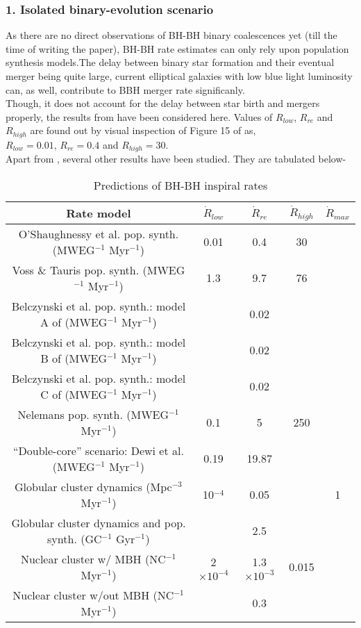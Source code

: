 \documentclass{article}
\numberwithin{equation}{section}
\begin{document}
\subsubsection*{1. Isolated binary-evolution scenario}
As there are no direct observations of BH-BH binary coalescences yet (till the time of writing the paper), BH-BH rate estimates can only rely upon population synthesis models.The delay between binary star formation and their eventual merger being quite large, current elliptical galaxies with low blue light luminosity can, as well, contribute to BBH merger rate significanly.\\
Though, it does not account for the delay between star birth and mergers properly, the results from \cite{14} have been considered here. Values of $R_{low}$, $R_{re}$ and $R_{high}$ are found out by visual inspection of Figure 15 of \cite{14} as,\\
$R_{low} = 0.01$, $R_{re} = 0.4$ and $R_{high} = 30$.\\
Apart from \cite{14}, several other results have been studied. They are tabulated below-

\begin{table}[h!]
	\centering
	\caption{Predictions of BH-BH inspiral rates}
	\label{tab:table1}
	\begin{tabular}{ccccc}
		\toprule
		Rate model & $\dot{R}_{low}$ & $\dot{R}_{re}$ & $\dot{R}_{high}$ & $\dot{R}_{max}$\\
		
		\midrule
		O’Shaughnessy et al. pop. synth. \cite{14} (MWEG$^{-1}$ Myr$^{-1}$) 			& 0.01 & 0.4 & 30 &\\
		Voss \& Tauris pop. synth. \cite{34} (MWEG$^{-1}$ Myr$^{-1}$)					& 1.3 & 9.7 & 76 &\\
		Belczynski et al. pop. synth.: model A of \cite{35} (MWEG$^{-1}$ Myr$^{-1}$) 	& & 0.02 & & \\
		Belczynski et al. pop. synth.: model B of \cite{35} (MWEG$^{-1}$ Myr$^{-1}$) 	& & 0.02 & & \\
		Belczynski et al. pop. synth.: model C of \cite{35} (MWEG$^{-1}$ Myr$^{-1}$) 	& & 0.02 & & \\
		Nelemans pop. synth. \cite{36} (MWEG$^{-1}$ Myr$^{-1}$) 						& 0.1 & 5 & 250 & \\
		“Double-core” scenario: Dewi et al. \cite{37} (MWEG$^{-1}$ Myr$^{-1}$)			& 0.19 & 19.87 & &\\
		Globular cluster dynamics \cite{55} (Mpc$^{-3}$ Myr$^{-1}$)						& 10$^{-4}$ & 0.05 & & 1\\
		Globular cluster dynamics and pop. synth. \cite{42} (GC$^{-1}$ Gyr$^{-1}$) 		& & 2.5 & & \\
		Nuclear cluster w/ MBH \cite{56} (NC$^{-1}$ Myr$^{-1}$)							& 2$\times10^{-4}$ & 1.3$\times10^{-3}$ & 0.015 &\\
		Nuclear cluster w/out MBH \cite{57} (NC$^{-1}$ Myr$^{-1}$)						& & 0.3 & &\\
		\bottomrule
	\end{tabular}
\end{table}



\newpage


\end{document}
